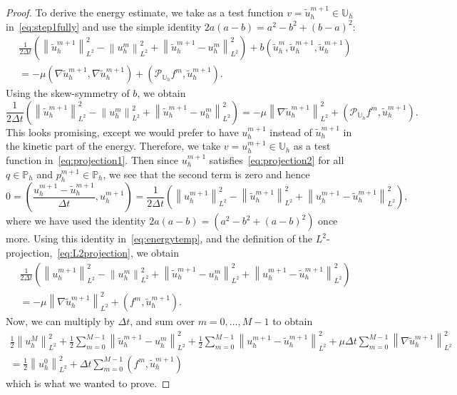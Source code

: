 \documentclass[10pt,letterpaper]{amsart}
\newcommand{\tu}{\widetilde{u}}
\newcommand\norm[1]{\left\lVert#1\right\rVert}
\newcommand{\Grad}{\nabla}
\newcommand{\Ph}{\mathbb{P}_h}
\newcommand{\Uh}{\mathbb{U}_h}
\newcommand{\PUh}{\mathcal{P}_{\Uh}}
\theoremstyle{definition}{\newtheorem{definition}[lemma]{Definition}}
\numberwithin{equation}{section}
\begin{document}
\begin{proof}
	To derive the energy estimate, we take as a test function $v=\tu^{m+1}_h\in\Uh$  in~\eqref{eq:step1fully} and use the simple identity $2a(a-b)=a^2-b^2+(b-a)^2$:
		\begin{multline*}
	\frac{1}{2\Delta t}\left(\norm{\tu^{m+1}_h}_{L^2}^2-\norm{u^m_h}^2_{L^2}+\norm{\tu_h^{m+1}-u^m_h}_{L^2}^2\right)+ b(\tu^m_h,\tu^{m+1}_h, \tu_h^{m+1})\\
= -\mu(\Grad \tu_h^{m+1},\Grad \tu_h^{m+1})+ (\PUh f^{m},\tu^{m+1}_h).
	\end{multline*}
	Using the skew-symmetry of $b$, we obtain
	\begin{equation}\label{eq:energytemp}
	\frac{1}{2\Delta t}\left(\norm{\tu^{m+1}_h}_{L^2}^2-\norm{u^m_h}^2_{L^2}+\norm{\tu_h^{m+1}-u^m_h}_{L^2}^2\right)
	= -\mu\norm{\Grad \tu_h^{m+1}}_{L^2}^2 + (\PUh f^{m},\tu^{m+1}_h).
	\end{equation}
	This looks promising, except we would prefer to have $u_h^{m+1}$ instead of $\tu^{m+1}_h$ in the kinetic part of the energy.
	Therefore, we take $v=u^{m+1}_h\in \Uh$ as a test function in~\eqref{eq:projection1}. Then since $u^{m+1}_h$ satisfies~\eqref{eq:projection2} for all $q\in\Ph$ and $p^{m+1}_h\in\Ph$, we see that the second term is zero and hence
	\begin{equation}\label{eq:utildebound}
	0=\left(\frac{u^{m+1}_h-\tu^{m+1}_h}{\Delta t},u^{m+1}_h\right)=\frac{1}{2\Delta t}\left(\norm{u^{m+1}_h}_{L^2}^2-\norm{\tu^{m+1}_h}^2_{L^2}+\norm{u^{m+1}_h-\tu^{m+1}_h}^2_{L^2}\right),
	\end{equation} 
	where we have used the identity $2a(a-b)= (a^2-b^2+(a-b)^2)$ once more.
Using this identity in~\eqref{eq:energytemp}, and the definition of the $L^2$-projection,~\eqref{eq:L2projection}, we obtain
\begin{multline}\label{eq:heart}
	\frac{1}{2\Delta t}\left(\norm{u^{m+1}_h}_{L^2}^2-\norm{u^m_h}^2_{L^2}+\norm{\tu_h^{m+1}-u^m_h}_{L^2}^2+\norm{u^{m+1}_h-\tu^{m+1}_h}^2_{L^2}\right)\\
= -\mu\norm{\Grad \tu_h^{m+1}}_{L^2}^2+ (  f^{m},\tu^{m+1}_h).
\end{multline}
Now, we can multiply by $\Delta t$, and sum over $m=0,\dots, M-1$ to obtain
\begin{multline*}
	\frac{1}{2}\norm{u^{M}_h}_{L^2}^2 +\frac12\sum_{m=0}^{M-1}\norm{\tu_h^{m+1}-u^m_h}_{L^2}^2 
+\frac12\sum_{m=0}^{M-1}\norm{u^{m+1}_h-\tu^{m+1}_h}^2_{L^2}+\mu\Delta t\sum_{m=0}^{M-1}\norm{\Grad \tu_h^{m+1}}_{L^2}^2
 \\
= \frac12\norm{u^0_h}^2_{L^2} +\Delta t \sum_{m=0}^{M-1} (  f^m,\tu^{m+1}_h)
\end{multline*}	
which is what we wanted to prove.	
\end{proof}
\end{document}
